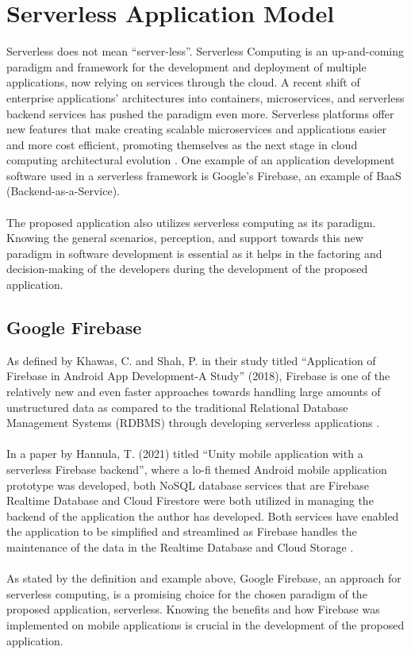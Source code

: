 \section{Serverless Application Model}

Serverless does not mean “server-less”. Serverless Computing is an up-and-coming paradigm and framework for the development and deployment of multiple applications, now relying on services through the cloud. A recent shift of enterprise applications’ architectures into containers, microservices, and serverless backend services has pushed the paradigm even more. Serverless platforms offer new features that make creating scalable microservices and applications easier and more cost efficient, promoting themselves as the next stage in cloud computing architectural evolution \cite{castro2017serverless}. One example of an application development software used in a serverless framework is Google’s Firebase, an example of BaaS (Backend-as-a-Service).
\\\\The proposed application also utilizes serverless computing as its paradigm. Knowing the general scenarios, perception, and support towards this new paradigm in software development is essential as it helps in the factoring and decision-making of the developers during the development of the proposed application.

\subsection{Google Firebase}

As defined by Khawas, C. and Shah, P. in their study titled “Application of Firebase in Android App Development-A Study” (2018), Firebase is one of the relatively new and even faster approaches towards handling large amounts of unstructured data as compared to the traditional Relational Database Management Systems (RDBMS) through developing serverless applications 
\cite{khawas2018application}.
\\\\In a paper by Hannula, T. (2021) titled “Unity mobile application with a serverless Firebase backend”, where a lo-fi themed Android mobile application prototype was developed, both NoSQL database services that are Firebase Realtime Database and Cloud Firestore were both utilized in managing the backend of the application the author has developed. Both services have enabled the application to be simplified and streamlined as Firebase handles the maintenance of the data in the Realtime Database and Cloud Storage \cite{hannula2021unity}.
\\\\As stated by the definition and example above, Google Firebase, an approach for serverless computing, is a promising choice for the chosen paradigm of the proposed application, serverless. Knowing the benefits and how Firebase was implemented on mobile applications is crucial in the development of the proposed application.


